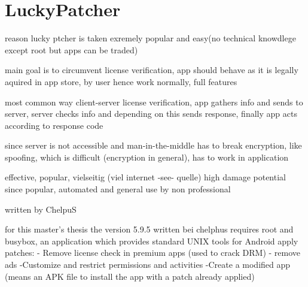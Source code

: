 \section{LuckyPatcher} \label{section:luckypatcher-explain}



%
reason lucky ptcher is taken exremely popular and easy(no technical knowdlege except root but apps can be traded)

main goal is to circumvent license verification, app should behave as it is legally aquired in app store, by user hence work normally, full features

most common way client-server license verification, app gathers info and sends to server, server checks info and depending on this sends response, finally app acts according to response code

since server is not accessible and man-in-the-middle has to break encryption, like spoofing, which is difficult (encryption in general), has to work in application

effective, popular, vielseitig (viel internet -see- quelle)
high damage potential since popular, automated and general use by non professional

\cite{munteanLicense}
%

written by ChelpuS

for this master's thesis the version 5.9.5
written bei chelphus
requires root and busybox, an application which provides standard UNIX tools for Android\cite{busyboxApp}
apply patches:
- Remove license check in premium apps (used to crack DRM)
- remove ads
-Customize and restrict permissions and activities
-Create a modified app (means an APK file to install the app with a patch already applied)

